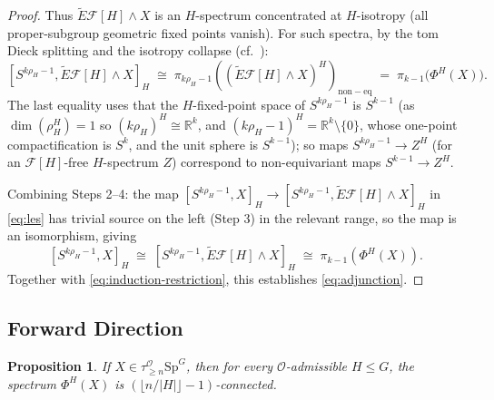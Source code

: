 \documentclass[12pt]{article}
\newtheorem{proposition}[theorem]{Proposition}
\theoremstyle{definition}
\newcommand{\calO}{\mathcal{O}}
\newcommand{\SpG}{\mathrm{Sp}^G}
\newcommand{\floor}[1]{\lfloor #1 \rfloor}
\begin{document}
\begin{proof}
Thus $\widetilde{E}\mathcal{F}[H] \wedge X$ is an $H$-spectrum concentrated at $H$-isotropy
(all proper-subgroup geometric fixed points vanish). For such spectra, by the tom Dieck
splitting and the isotropy collapse (cf.\ \cite[Proposition 9.9]{HHR2016}):
\begin{equation}
\label{eq:tom-dieck-collapse}
  [S^{k\rho_H - 1}, \widetilde{E}\mathcal{F}[H] \wedge X]_H
  \;\cong\; \pi_{k\rho_H - 1}\!\left((\widetilde{E}\mathcal{F}[H] \wedge X)^H\right)_{\mathrm{non-eq}}
  \;=\; \pi_{k-1}\!\bigl(\Phi^H(X)\bigr).
\end{equation}
The last equality uses that the $H$-fixed-point space of $S^{k\rho_H - 1}$ is $S^{k-1}$
(as $\dim(\rho_H^H) = 1$ so $(k\rho_H)^H \cong \mathbb{R}^k$, and
$(k\rho_H - 1)^H = \mathbb{R}^k \setminus \{0\}$, whose one-point compactification is $S^k$,
and the unit sphere is $S^{k-1}$); so maps $S^{k\rho_H-1} \to Z^H$ (for an
$\mathcal{F}[H]$-free $H$-spectrum $Z$) correspond to non-equivariant maps $S^{k-1} \to Z^H$.

Combining Steps 2--4: the map $[S^{k\rho_H-1},X]_H \to [S^{k\rho_H-1}, \widetilde{E}
\mathcal{F}[H] \wedge X]_H$ in \eqref{eq:les} has trivial source on the left (Step 3) in the
relevant range, so the map is an isomorphism, giving
\[
  [S^{k\rho_H - 1}, X]_H \;\cong\; [S^{k\rho_H-1}, \widetilde{E}\mathcal{F}[H] \wedge X]_H
  \;\cong\; \pi_{k-1}(\Phi^H(X)).
\]
Together with \eqref{eq:induction-restriction}, this establishes \eqref{eq:adjunction}.
\end{proof}

\subsection{Forward Direction}

\begin{proposition}
\label{prop:forward}
If $X \in \tau_{\geq n}^{\calO}\SpG$, then for every $\calO$-admissible $H \leq G$, the
spectrum $\Phi^H(X)$ is $(\floor{n/|H|}-1)$-connected.
\end{proposition}
\end{document}
